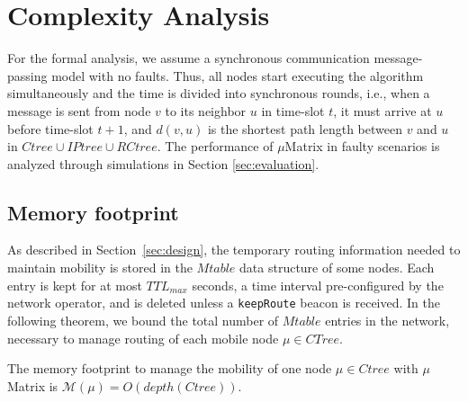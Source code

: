 
\section{Complexity Analysis}
\label{sec:analysis}

For the formal analysis, we assume a synchronous communication message-passing model with no faults. Thus, all nodes start executing the algorithm simultaneously and the time is divided into synchronous rounds, i.e., when a message is sent from node $v$ to its neighbor $u$ in time-slot $t$, it must arrive at $u$ before time-slot $t + 1$, and $d(v,u)$ is the shortest path length between $v$ and $u$ in $Ctree \cup IPtree \cup RCtree$. The performance of $\mu$Matrix in faulty scenarios is analyzed through simulations in Section \ref{sec:evaluation}.

\subsection{Memory footprint}
\label{subsec:memory-footprint}

As described in Section~\ref{sec:design}, the temporary routing information needed to maintain mobility is stored in the $Mtable$ data structure of some nodes. Each entry is kept for at most $TTL_{max}$ seconds, a time interval pre-configured by the network operator, and is deleted unless a \texttt{keepRoute} beacon is received. In the following theorem, we bound the total number of $Mtable$ entries in the network, necessary to manage routing of each mobile node $\mu \in CTree$.

\begin{theorem}\label{thm:memOneNode}
The memory footprint to manage the mobility of one node $\mu \in Ctree$ with $\mu$Matrix is $\mathcal{M}(\mu)=O(depth(Ctree))$.
\end{theorem}


